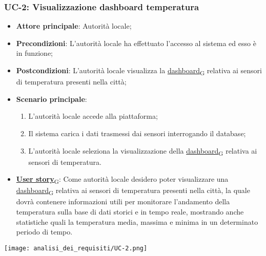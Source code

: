 \subsubsection{UC-2: Visualizzazione dashboard temperatura}
\begin{itemize}
	\item \textbf{Attore principale}: Autorità locale;
	\item \textbf{Precondizioni}: L'autorità locale ha effettuato l'accesso al sistema ed esso è in funzione;
	\item \textbf{Postcondizioni}: L'autorità locale visualizza la \href{https://7last.github.io/docs/rtb/documentazione-interna/glossario\#dashboard}{dashboard\textsubscript{G}} relativa
	      ai sensori di temperatura presenti nella città;
	\item \textbf{Scenario principale}:
	      \begin{enumerate}
		      \item L'autorità locale accede alla piattaforma;
		      \item Il sistema carica i dati trasmessi dai sensori interrogando il database;
		      \item L'autorità locale seleziona la visualizzazione della \href{https://7last.github.io/docs/rtb/documentazione-interna/glossario\#dashboard}{dashboard\textsubscript{G}} relativa ai sensori di temperatura.
	      \end{enumerate}
	\item \href{https://7last.github.io/docs/rtb/documentazione-interna/glossario\#user-story}{\textbf{User story}\textsubscript{G}}:
	      Come autorità locale desidero poter visualizzare una \href{https://7last.github.io/docs/rtb/documentazione-interna/glossario\#dashboard}{dashboard\textsubscript{G}} relativa ai sensori di temperatura presenti nella città, la quale
	      dovrà contenere informazioni utili per monitorare l'andamento della temperatura sulla base di dati storici e in tempo reale, mostrando
	      anche statistiche quali la temperatura media, massima e minima in un determinato periodo di tempo.
\end{itemize}
\begin{center}
	\texttt{[image: analisi\_dei\_requisiti/UC-2.png]}
\end{center}

